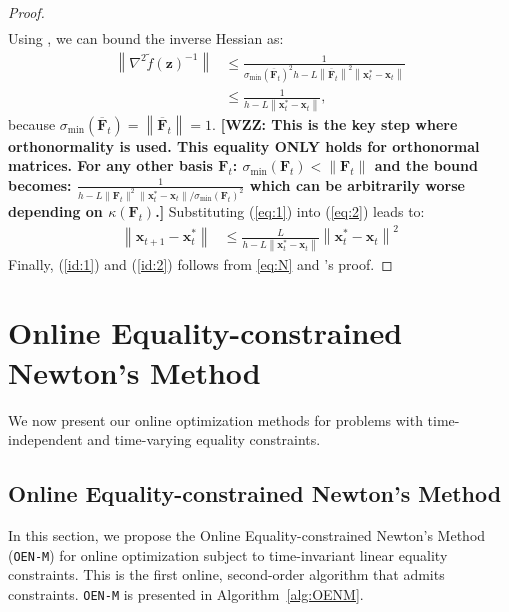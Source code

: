 \documentclass[journal,twoside,web]{ieeecolor}
\newcommand{\norm}[1]{\left\lVert#1\right\rVert}
\newcommand{\xx}{\mathbf{x}}
\newcommand{\zz}{\mathbf{z}}
\newcommand{\FF}{\mathbf{F}}
\newcommand{\FFo}{\overline{\FF}_t}
\newcommand{\WZZ}[1]{{\color{red}\bf{[WZZ: #1]}}}
\begin{document}
\begin{proof}
\begin{align}
    \label{eq:1}
\end{align}
Using \cite[Lemma 2]{OnlineNewton}, we can bound the inverse Hessian as:
\begin{align}
    \norm{\nabla^2\tilde{f}(\zz)^{-1}} &\le \frac{1}{\sigma_{\min}(\FFo)^2h-L\norm{\FFo}^2\norm{\xx^*_t-\xx_t}}\nonumber\\
    &\le \frac{1}{h-L\norm{\xx^*_t-\xx_t}},
    \label{eq:2}
\end{align}
because $\sigma_{\min}(\FFo)=\norm{\FFo}=1$.
\WZZ{This is the key step where orthonormality is used. This equality ONLY holds for orthonormal matrices.
For any other basis $\FF_t$: $\sigma_{\min}(\FF_t) < \|\FF_t\|$ and the bound becomes:
$\frac{1}{h - L\|\FF_t\|^2\|\xx_t^* - \xx_t\|/\sigma_{\min}(\FF_t)^2}$
which can be arbitrarily worse depending on $\kappa(\FF_t)$.}
Substituting (\ref{eq:1}) into (\ref{eq:2}) leads to:
\begin{align}
\label{eq:N}
    \norm{\xx_{t+1}-\xx_t^*} &\le \frac{L}{h-L\norm{\xx_t^*-\xx_t}}\norm{\xx_t^*-\xx_t}^2
\end{align}
Finally, (\ref{id:1}) and (\ref{id:2}) follows from \eqref{eq:N} and \cite[Lemma 2]{OnlineNewton}'s proof.
\end{proof}
\section{Online Equality-constrained Newton's Method}
We now present our online optimization methods for problems with time-independent and time-varying equality constraints. 
\subsection{Online Equality-constrained Newton's Method}
In this section, we propose the Online Equality-constrained Newton's Method (\texttt{OEN-M}) for online optimization subject to time-invariant linear equality constraints. This is the first online, second-order algorithm that admits constraints. \texttt{OEN-M} is presented in Algorithm~\ref{alg:OENM}.
\end{document}
